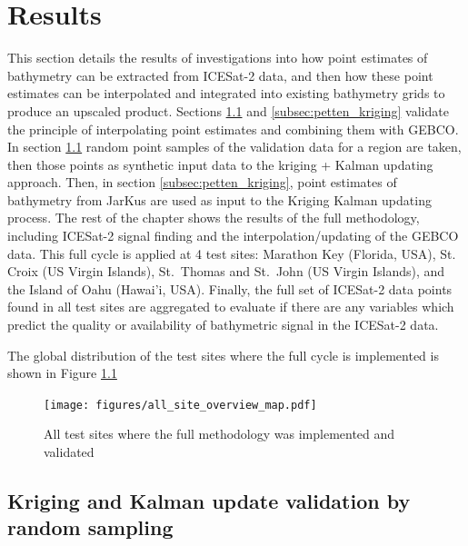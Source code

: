 
\chapter{Results}

This section details the results of investigations into how point estimates of bathymetry can be extracted from ICESat-2 data, and then how these point estimates can be interpolated and integrated into existing bathymetry grids to produce an upscaled product. Sections \ref{subsec:randomsample} and \ref{subsec:petten_kriging} validate the principle of interpolating point estimates and combining them with GEBCO. In section \ref{subsec:randomsample} random point samples of the validation data for a region are taken, then those points as synthetic input data to the kriging + Kalman updating approach. Then, in section \ref{subsec:petten_kriging}, point estimates of bathymetry from JarKus are used as input to the Kriging Kalman updating process. The rest of the chapter shows the results of the full methodology, including ICESat-2 signal finding and the interpolation/updating of the GEBCO data. This full cycle is applied at 4 test sites: Marathon Key (Florida, USA), St.~ Croix (US Virgin Islands), St.~Thomas and St.~John (US Virgin Islands), and the Island of Oahu (Hawai'i, USA). Finally, the full set of ICESat-2 data points found in all test sites are aggregated to evaluate if there are any variables which predict the quality or availability of bathymetric signal in the ICESat-2 data.

The global distribution of the test sites where the full cycle is implemented is shown in Figure \ref{fig:world-site-map}

\begin{figure}[!ht]
    \centering
    \texttt{[image: figures/all\_site\_overview\_map.pdf]}
    \caption{All test sites where the full methodology was implemented and validated}
    \label{fig:world-site-map}
\end{figure}

\section{Kriging and Kalman update validation by random sampling}\label{subsec:randomsample}

